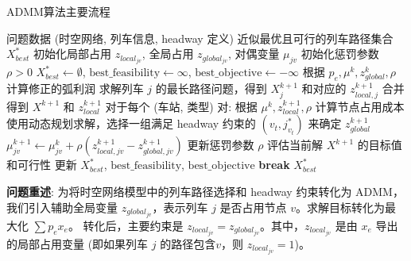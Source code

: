 \documentclass{article}
\begin{document}
    \begin{algorithm}[ht]
        \caption{ADMM算法主要流程}
        \begin{algorithmic}[1]
            \Require 问题数据 (时空网络, 列车信息, headway 定义)
            \Ensure 近似最优且可行的列车路径集合 $X_{best}^*$
            \State 初始化局部占用 $z_{local_{jv}}$, 全局占用 $z_{global_{jv}}$, 对偶变量 $\mu_{jv}$
            \State 初始化惩罚参数 $\rho > 0$
            \State $X_{best}^* \gets \emptyset$,
            $\text{best\_feasibility} \gets \infty$,
            $\text{best\_objective} \gets -\infty$
                \State {}
                    \State 根据 $p_e, \mu^k, z_{global}^k, \rho$ 计算修正的弧利润
                    \State 求解列车 $j$ 的最长路径问题，得到 $X_j^{k+1}$ 和对应的 $z_{local,j}^{k+1}$
                \EndFor
                \State 合并得到 $X^{k+1}$ 和 $z_{local}^{k+1}$
                \State {}
                \State 对于每个 (车站, 类型) 对:
                \State \quad 根据 $\mu^k, z_{local}^{k+1}, \rho$ 计算节点占用成本
                \State \quad 使用动态规划求解，选择一组满足 headway 约束的 $(v_t, j^*_{v_t})$
                来确定 $z_{global}^{k+1}$
                \State {}
                \State $\mu_{jv}^{k+1} \gets \mu_{jv}^k + \rho
                (z_{local,jv}^{k+1} - z_{global,jv}^{k+1})$
                \State 更新惩罚参数 $\rho$
                \State 评估当前解 $X^{k+1}$ 的目标值和可行性
                    \State 更新 $X_{best}^*$, $\text{best\_feasibility}$,
                    $\text{best\_objective}$
                \EndIf
                    \State \textbf{break}
                \EndIf
            \EndFor
            \State \Return $X_{best}^*$
        \end{algorithmic}\label{alg:algorithm}
    \end{algorithm}

    \textbf{问题重述}:
    为将时空网络模型中的列车路径选择和 headway 约束转化为 ADMM，我们引入辅助全局变量
    $z_{global_{jv}}$，表示列车 $j$ 是否占用节点 $v$。求解目标转化为最大化 $\sum p_e x_e$。
    转化后，主要约束是 $z_{local_{jv}} = z_{global_{jv}}$。其中，$z_{local_{jv}}$ 是由
    $x_e$ 导出的局部占用变量 (即如果列车 $j$ 的路径包含$v$，则 $z_{local_{jv}}=1$)。
\end{document}
